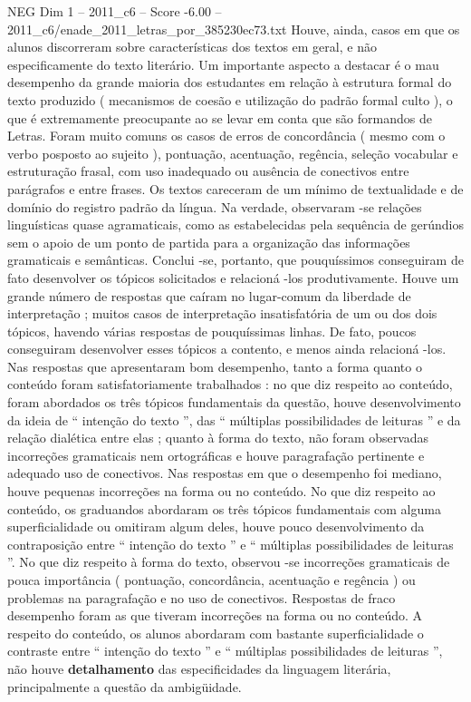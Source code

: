 \begin{textsample}{NEG Dim 1 – 2011\_c6 – Score -6.00 – 2011\_c6/enade\_2011\_letras\_por\_385230ec73.txt}
Houve, ainda, casos em que os alunos discorreram sobre características dos textos em geral, e não especificamente do texto literário.
Um importante aspecto a destacar é o mau desempenho da grande maioria dos estudantes em relação à estrutura formal do texto produzido ( mecanismos de coesão e utilização do padrão formal culto ), o que é extremamente preocupante ao se levar em conta que são formandos de Letras.
Foram muito comuns os casos de erros de concordância ( mesmo com o verbo posposto ao sujeito ), pontuação, acentuação, regência, seleção vocabular e estruturação frasal, com uso inadequado ou ausência de conectivos entre parágrafos e entre frases.
Os textos careceram de um mínimo de textualidade e de domínio do registro padrão da língua.
Na verdade, observaram -se relações linguísticas quase agramaticais, como as estabelecidas pela sequência de gerúndios sem o apoio de um ponto de partida para a organização das informações gramaticais e semânticas.
Conclui -se, portanto, que pouquíssimos conseguiram de fato desenvolver os tópicos solicitados e relacioná -los produtivamente.
Houve um grande número de respostas que caíram no lugar-comum da liberdade de interpretação ; muitos casos de interpretação insatisfatória de um ou dos dois tópicos, havendo várias respostas de pouquíssimas linhas.
De fato, poucos conseguiram desenvolver esses tópicos a contento, e menos ainda relacioná -los.
Nas respostas que apresentaram bom desempenho, tanto a forma quanto o conteúdo foram satisfatoriamente trabalhados : no que diz respeito ao conteúdo, foram abordados os três tópicos fundamentais da questão, houve desenvolvimento da ideia de “ intenção do texto ”, das “ múltiplas possibilidades de leituras ” e da relação dialética entre elas ; quanto à forma do texto, não foram observadas incorreções gramaticais nem ortográficas e houve paragrafação pertinente e adequado uso de conectivos.
Nas respostas em que o desempenho foi mediano, houve pequenas incorreções na forma ou no conteúdo.
No que diz respeito ao conteúdo, os graduandos abordaram os três tópicos fundamentais com alguma superficialidade ou omitiram algum deles, houve pouco desenvolvimento da contraposição entre “ intenção do texto ” e “ múltiplas possibilidades de leituras ”.
No que diz respeito à forma do texto, observou -se incorreções gramaticais de pouca importância ( pontuação, concordância, acentuação e regência ) ou problemas na paragrafação e no uso de conectivos.
Respostas de fraco desempenho foram as que tiveram incorreções na forma ou no conteúdo.
A respeito do conteúdo, os alunos abordaram com bastante superficialidade o contraste entre “ intenção do texto ” e “ múltiplas possibilidades de leituras ”, não houve \textbf{detalhamento} das especificidades da linguagem literária, principalmente a questão da ambigüidade.

\end{textsample}
